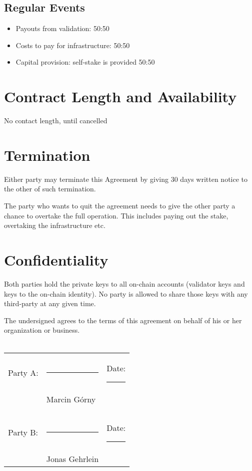 \documentclass[10pt]{article}
\begin{document}
\subsection{Regular Events}

\begin{itemize}
    \item Payouts from validation: 50:50
    \item Costs to pay for infrastructure: 50:50
    \item Capital provision: self-stake is provided 50:50
\end{itemize}


\section{Contract Length and Availability}

No contact length, until cancelled

\section{Termination}

Either party may terminate this Agreement by giving 30 days written notice
to the other of such termination. 

The party who wants to quit the agreement needs to give the other party a chance to overtake the full operation. This includes paying out the stake, overtaking the infrastructure etc.

\section{Confidentiality}

Both parties hold the private keys to all on-chain accounts (validator keys and keys to the on-chain identity). No party is allowed to share those keys with any third-party at any given time.



\vspace{1cm} 

\noindent The undersigned agrees to the terms of this agreement on behalf of his or
her organization or business.\\\\

\noindent \begin{tabular}{l l l}
Party A: & \rule{6cm}{.2pt} & Date: \rule{2.4cm}{.2pt}\\
                         & Marcin Górny      & \\\\\\
Party B:          & \rule{6cm}{.2pt} & Date: \rule{2.4cm}{.2pt}\\
                         & Jonas Gehrlein      & \\
\end{tabular}
\end{document}
